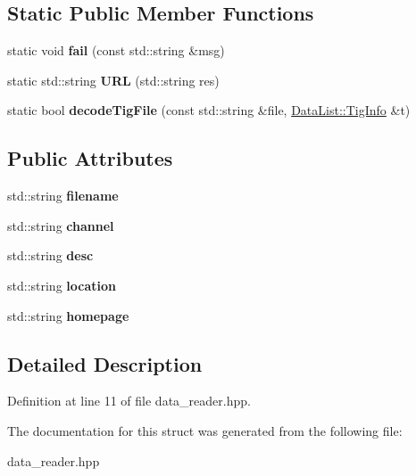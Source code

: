 \subsection*{Static Public Member Functions}
\begin{DoxyCompactItemize}
\item 
\hypertarget{struct_tig_list_reader_a6748272859c72f46360a328ff541cc85}{static void {\bfseries fail} (const std\-::string \&msg)}\label{struct_tig_list_reader_a6748272859c72f46360a328ff541cc85}

\item 
\hypertarget{struct_tig_list_reader_a8f449c7e4157fd71dc340c036a326cb7}{static std\-::string {\bfseries U\-R\-L} (std\-::string res)}\label{struct_tig_list_reader_a8f449c7e4157fd71dc340c036a326cb7}

\item 
\hypertarget{struct_tig_list_reader_af29a36cd17c2975c595b8882c2b1c01b}{static bool {\bfseries decode\-Tig\-File} (const std\-::string \&file, \hyperlink{struct_data_list_1_1_tig_info}{Data\-List\-::\-Tig\-Info} \&t)}\label{struct_tig_list_reader_af29a36cd17c2975c595b8882c2b1c01b}

\end{DoxyCompactItemize}
\subsection*{Public Attributes}
\begin{DoxyCompactItemize}
\item 
\hypertarget{struct_tig_list_reader_aaa60a48156f69359f58e4362743f5eaf}{std\-::string {\bfseries filename}}\label{struct_tig_list_reader_aaa60a48156f69359f58e4362743f5eaf}

\item 
\hypertarget{struct_tig_list_reader_a8dd3a2f72ac238bff02c17b66d65772c}{std\-::string {\bfseries channel}}\label{struct_tig_list_reader_a8dd3a2f72ac238bff02c17b66d65772c}

\item 
\hypertarget{struct_tig_list_reader_a9669bd8cac702a9488dc4a0238cc669e}{std\-::string {\bfseries desc}}\label{struct_tig_list_reader_a9669bd8cac702a9488dc4a0238cc669e}

\item 
\hypertarget{struct_tig_list_reader_ad27903d76be03131812f93c82d91a240}{std\-::string {\bfseries location}}\label{struct_tig_list_reader_ad27903d76be03131812f93c82d91a240}

\item 
\hypertarget{struct_tig_list_reader_ae3f2670c81427bf36f7c3889a28daa43}{std\-::string {\bfseries homepage}}\label{struct_tig_list_reader_ae3f2670c81427bf36f7c3889a28daa43}

\end{DoxyCompactItemize}


\subsection{Detailed Description}


Definition at line 11 of file data\-\_\-reader.\-hpp.



The documentation for this struct was generated from the following file\-:\begin{DoxyCompactItemize}
\item 
data\-\_\-reader.\-hpp\end{DoxyCompactItemize}
